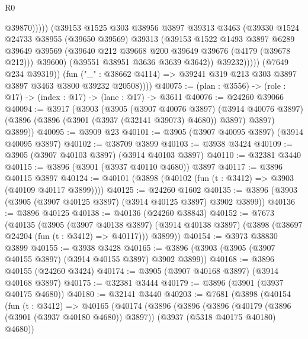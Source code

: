\begin{lexlean}{R0}
\begin{coremodule}
                              @39870)))))
                    (@39153
                      @1525
                      @303
                      @38956
                      @3897
                      @39313
                      @3463
                      (@39330
                        @1524
                        @24733
                        @38955
                        (@39650 @39569)
                        @39313
                        (@39153
                          @1522
                          @1493
                          @3897
                          @6289
                          @39649
                          @39569
                          (@39640 @212 @39668 @200 @39649 @39676 (@4179 (@39678 @212)))
                          @39600)
                        (@39551 @38951 @3636 @3639 @3642))
                      @39232)))))
            (@7649 @234 @39319))
          (fun ("_" : @38662 @4114) =>
          @39241 @319 @213 @303 @3897 @3897 @3463 @3800 @39232 @20508))))
@40075 := (plan : @3556) -> (role : @17) -> (index : @17) -> (lane : @17) -> @3611
@40076 := @24260 @39066
@40094 := @3917
    (@3903
      (@3905
        (@3907 @40076 @3897)
        (@3914 @40076 @3897)
        (@3896 (@3896 (@3901 (@3937 (@32141 @39073) @4680)) @3897) @3897)
        @3899))
@40095 := @3909 @23
@40101 := @3905 (@3907 @40095 @3897) (@3914 @40095 @3897)
@40102 := @38709 @3899
@40103 := @3938 @3424
@40109 := @3905 (@3907 @40103 @3897) (@3914 @40103 @3897)
@40110 := @32381 @3440
@40115 := @3896 (@3901 (@3937 @40110 @4680)) @3897
@40117 := @3896 @40115 @3897
@40124 := @40101 (@3898 (@40102 (fun (t : @3412) => @3903 (@40109 @40117 @3899))))
@40125 := @24260 @1602
@40135 := @3896 (@3903 (@3905 (@3907 @40125 @3897) (@3914 @40125 @3897) @3902 @3899))
@40136 := @3896 @40125
@40138 := @40136 (@24260 @38843)
@40152 := @7673
    (@40135
      (@3905
        (@3907 @40138 @3897)
        (@3914 @40138 @3897)
        (@3898 (@38697 @24204 (fun (t : @3412) => @40117)))
        @3899))
@40154 := @3973 @38830 @3899
@40155 := @3938 @3428
@40165 := @3896 (@3903 (@3905 (@3907 @40155 @3897) (@3914 @40155 @3897) @3902 @3899))
@40168 := @3896 @40155 (@24260 @3424)
@40174 := @3905 (@3907 @40168 @3897) (@3914 @40168 @3897)
@40175 := @32381 @3444
@40179 := @3896 (@3901 (@3937 @40175 @4680))
@40180 := @32141 @3440
@40203 := @7681
    (@3898
      (@40154
        (fun (t : @3412) =>
        @40165
          (@40174
            (@3896
              (@3896
                (@3896
                  (@40179 (@3896 (@3901 (@3937 @40180 @4680)) @3897))
                  (@3937 (@5318 @40175 @40180) @4680))

\end{coremodule}
\end{lexlean}

